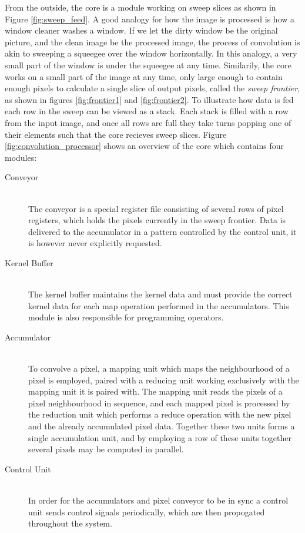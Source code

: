 From the outside, the core is a module working on sweep slices as shown in Figure \ref{fig:sweep_feed}.
A good analogy for how the image is processed is how a window cleaner washes a window.
If we let the dirty window be the original picture, and the clean image be the processed image, the process of convolution is akin to sweeping a squeegee over the window horizontally.
In this analogy, a very small part of the window is under the squeegee at any time.
Similarily, the core works on a small part of the image at any time, only large enough to contain enough pixels to calculate a single slice of output pixels, called the \textit{sweep frontier}, as shown in figures \ref{fig:frontier1} and \ref{fig:frontier2}.
To illustrate how data is fed each row in the sweep can be viewed as a stack.
Each stack is filled with a row from the input image, and once all rows are full they take turns popping one of their elements such that the core recieves sweep slices.
Figure \ref{fig:convolution_processor} shows an overview of the core which contains four modules:

\begin{description}
    \item[Conveyor] \hfill\\ 
        The conveyor is a special register file consisting of several rows of pixel registers, which holds the pixels currently in the sweep frontier.
        Data is delivered to the accumulator in a pattern controlled by the control unit, it is however never explicitly requested.
    \item[Kernel Buffer] \hfill\\
        The kernel buffer maintains the kernel data and must provide the correct kernel data for each map operation performed in the accumulators.
        This module is also responsible for programming operators.
    \item[Accumulator] \hfill\\
        To convolve a pixel, a mapping unit which maps the neighbourhood of a pixel is employed, paired with a reducing unit working exclusively with the mapping unit it is paired with.
        The mapping unit reads the pixels of a pixel neighbourhood in sequence, and each mapped pixel is processed by the reduction unit which performs a reduce operation with the new pixel and the already accumulated pixel data.
        Together these two units forms a single accumulation unit, and by employing a row of these units together several pixels may be computed in parallel.
    \item[Control Unit] \hfill\\
        In order for the accumulators and pixel conveyor to be in sync a control unit sends control signals periodically, which are then propogated throughout the system.
\end{description}

